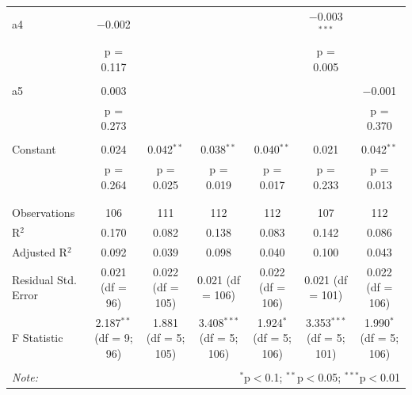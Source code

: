 \begin{table}[!htbp]
\begin{tabular}{@{\extracolsep{5pt}}lcccccc}
 a4 & $-$0.002 &  &  &  & $-$0.003$^{***}$ &  \\ 
  & p = 0.117 &  &  &  & p = 0.005 &  \\ 
  & & & & & & \\ 
 a5 & 0.003 &  &  &  &  & $-$0.001 \\ 
  & p = 0.273 &  &  &  &  & p = 0.370 \\ 
  & & & & & & \\ 
 Constant & 0.024 & 0.042$^{**}$ & 0.038$^{**}$ & 0.040$^{**}$ & 0.021 & 0.042$^{**}$ \\ 
  & p = 0.264 & p = 0.025 & p = 0.019 & p = 0.017 & p = 0.233 & p = 0.013 \\ 
  & & & & & & \\ 
\hline \\[-1.8ex] 
Observations & 106 & 111 & 112 & 112 & 107 & 112 \\ 
R$^{2}$ & 0.170 & 0.082 & 0.138 & 0.083 & 0.142 & 0.086 \\ 
Adjusted R$^{2}$ & 0.092 & 0.039 & 0.098 & 0.040 & 0.100 & 0.043 \\ 
Residual Std. Error & 0.021 (df = 96) & 0.022 (df = 105) & 0.021 (df = 106) & 0.022 (df = 106) & 0.021 (df = 101) & 0.022 (df = 106) \\ 
F Statistic & 2.187$^{**}$ (df = 9; 96) & 1.881 (df = 5; 105) & 3.408$^{***}$ (df = 5; 106) & 1.924$^{*}$ (df = 5; 106) & 3.353$^{***}$ (df = 5; 101) & 1.990$^{*}$ (df = 5; 106) \\ 
\hline 
\hline \\[-1.8ex] 
\textit{Note:}  & \multicolumn{6}{r}{$^{*}$p$<$0.1; $^{**}$p$<$0.05; $^{***}$p$<$0.01} \\ 
\end{tabular} 
\end{table}




